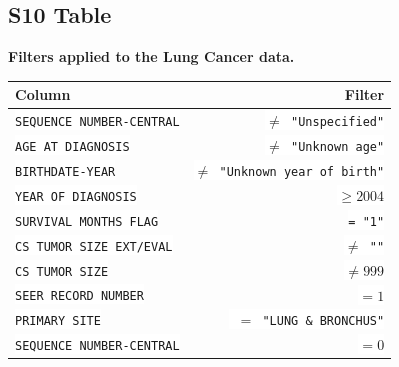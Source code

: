 \documentclass[10pt,letterpaper]{article}
\newcommand{\codewhite}[1]{\colorbox{white}{\texttt{#1}}}
\begin{document}
\subsection*{S10 Table}
\label{S10_Table}
{\bf Filters applied to the Lung Cancer data.}
\begin{table}[H]
\begin{adjustwidth}{-2.25in}{0in} %
\begin{tabular}{lr}
\toprule
 Column &  Filter \\
\midrule
\codewhite{SEQUENCE NUMBER-CENTRAL} & \codewhite{$\neq$ "Unspecified"} \\
\codewhite{AGE AT DIAGNOSIS} & \codewhite{$\neq$ "Unknown age"} \\
\codewhite{BIRTHDATE-YEAR} & \codewhite{$\neq$ "Unknown year of birth"} \\
\codewhite{YEAR OF DIAGNOSIS} & \codewhite{$\geq 2004$} \\
\codewhite{SURVIVAL MONTHS FLAG} & \codewhite{= "1"}\\
\codewhite{CS TUMOR SIZE EXT/EVAL} & \codewhite{$\neq$ ""} \\
\codewhite{CS TUMOR SIZE} & \codewhite{$\neq 999$} \\
\codewhite{SEER RECORD NUMBER} & \codewhite{$= 1$} \\
\codewhite{PRIMARY SITE} & \codewhite{ $=$ "LUNG \& BRONCHUS"} \\
\codewhite{SEQUENCE NUMBER-CENTRAL} & \codewhite{$=0$} \\
\bottomrule
\end{tabular}
\end{adjustwidth}
\end{table}
\end{document}
